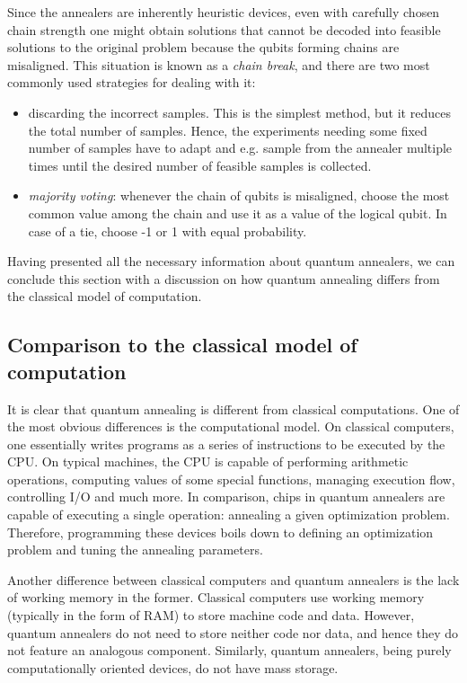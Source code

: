 Since the annealers are inherently heuristic devices, even with carefully
chosen chain strength one might obtain solutions that cannot be decoded into
feasible solutions to the original problem because the qubits forming chains
are misaligned. This situation is known as a \emph{chain break}, and there are
two most commonly used strategies for dealing with it:

\begin{itemize}
  \item discarding the incorrect samples. This is the simplest method, but it reduces
    the total number of samples. Hence, the experiments needing some fixed number
    of samples have to adapt and e.g. sample from the annealer multiple times until
    the desired number of feasible samples is collected.
  \item \emph{majority voting}: whenever the chain of qubits is misaligned, choose the most common value
    among the chain and use it as a value of the logical qubit. In case of a tie, choose
    -1 or 1 with equal probability.
\end{itemize}

Having presented all the necessary information about quantum annealers, we can
conclude this section with a discussion on how quantum annealing differs from
the classical model of computation.

\subsection{Comparison to the classical model of computation}
It is clear that quantum annealing is different from classical computations.
One of the most obvious differences is the computational model. On classical
computers, one essentially writes programs as a series of instructions to be
executed by the CPU. On typical machines, the CPU is capable of performing
arithmetic operations, computing values of some special functions, managing
execution flow, controlling I/O and much more. In comparison, chips in quantum
annealers are capable of executing a single operation: annealing a given
optimization problem. Therefore, programming these devices boils down to
defining an optimization problem and tuning the annealing parameters.

Another difference between classical computers and quantum annealers is the
lack of working memory in the former. Classical computers use working memory
(typically in the form of RAM) to store machine code and data. However, quantum
annealers do not need to store neither code nor data, and hence they do not
feature an analogous component. Similarly, quantum annealers, being purely
computationally oriented devices, do not have mass storage.

